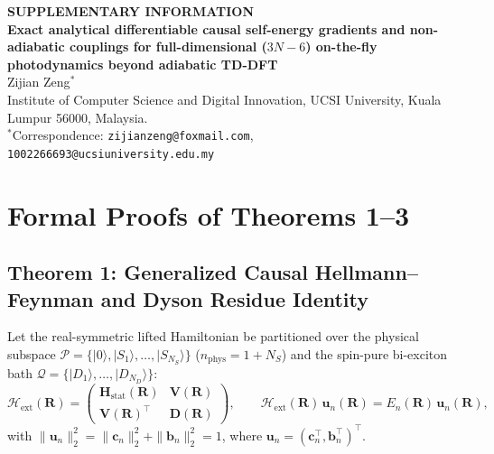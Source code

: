 \documentclass[10pt]{article}
\theoremstyle{natthm}
\newcommand{\Hext}{\mathcal{H}_{\mathrm{ext}}}
\begin{document}
\begin{center}
  {\sffamily\bfseries\fontsize{9}{11}\selectfont\color{natblue} SUPPLEMENTARY INFORMATION}\\[6pt]
  {\sffamily\bfseries\fontsize{14}{17.5}\selectfont\color{natdark}
  Exact analytical differentiable causal self-energy gradients and non-adiabatic couplings for full-dimensional ($3N{-}6$) on-the-fly photodynamics beyond adiabatic TD-DFT}\\[6pt]
  {\sffamily\fontsize{9.5}{11.5}\selectfont\color{natdark} Zijian Zeng$^{*}$}\\
  {\sffamily\fontsize{8}{10}\selectfont\color{natgray}
  Institute of Computer Science and Digital Innovation, UCSI University, Kuala Lumpur 56000, Malaysia.\\
  $^{*}$Correspondence: \texttt{zijianzeng@foxmail.com}, \texttt{1002266693@ucsiuniversity.edu.my}}
\end{center}
\vspace{8pt}
\tableofcontents
\vspace{12pt}

\section{Formal Proofs of Theorems 1--3}

\subsection{Theorem 1: Generalized Causal Hellmann--Feynman and Dyson Residue Identity}

Let the real-symmetric lifted Hamiltonian be partitioned over the physical subspace $\mathcal{P} = \{|0\rangle, |S_1\rangle, \dots, |S_{N_S}\rangle\}$ ($n_{\mathrm{phys}} = 1 + N_S$) and the spin-pure bi-exciton bath $\mathcal{Q} = \{|D_1\rangle, \dots, |D_{N_D}\rangle\}$:
\begin{equation}
  \Hext(\mathbf{R}) =
  \begin{pmatrix}
    \mathbf{H}_{\mathrm{stat}}(\mathbf{R}) & \mathbf{V}(\mathbf{R}) \\
    \mathbf{V}(\mathbf{R})^\top & \mathbf{D}(\mathbf{R})
  \end{pmatrix}, \qquad
  \Hext(\mathbf{R})\,\mathbf{u}_n(\mathbf{R}) = E_n(\mathbf{R})\,\mathbf{u}_n(\mathbf{R}),
\end{equation}
with $\|\mathbf{u}_n\|_2^2 = \|\mathbf{c}_n\|_2^2 + \|\mathbf{b}_n\|_2^2 = 1$, where $\mathbf{u}_n = (\mathbf{c}_n^\top, \mathbf{b}_n^\top)^\top$.
\end{document}
